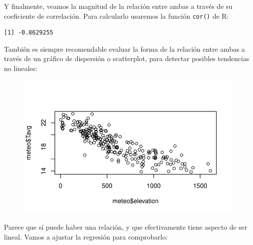 \documentclass[
  letterpaper,
  DIV=11,
  numbers=noendperiod]{scrreprt}
\newenvironment{Shaded}{\begin{snugshade}}{\end{snugshade}}
\newcommand{\AttributeTok}[1]{\textcolor[rgb]{0.40,0.45,0.13}{#1}}
\newcommand{\FunctionTok}[1]{\textcolor[rgb]{0.28,0.35,0.67}{#1}}
\newcommand{\NormalTok}[1]{\textcolor[rgb]{0.00,0.23,0.31}{#1}}
\newcommand{\SpecialCharTok}[1]{\textcolor[rgb]{0.37,0.37,0.37}{#1}}
\begin{document}
Y finalmente, veamos la magnitud de la relación entre ambas a través de
su coeficiente de correlación. Para calcularlo usaremos la función
\texttt{cor()} de R:

\begin{Shaded}
\end{Shaded}

\begin{verbatim}
[1] -0.8629255
\end{verbatim}

También es siempre recomendable evaluar la forma de la relación entre
ambas a través de un gráfico de dispersión o scatterplot, para detectar
posibles tendencias no lineales:

\begin{Shaded}
\end{Shaded}

\begin{figure}[H]

{\centering \includegraphics{01_RegresionLineal_files/figure-pdf/unnamed-chunk-7-1.pdf}

}

\end{figure}

Parece que sí puede haber una relación, y que efectivamente tiene
aspecto de ser lineal. Vamos a ajustar la regresión para comprobarlo:
\end{document}
